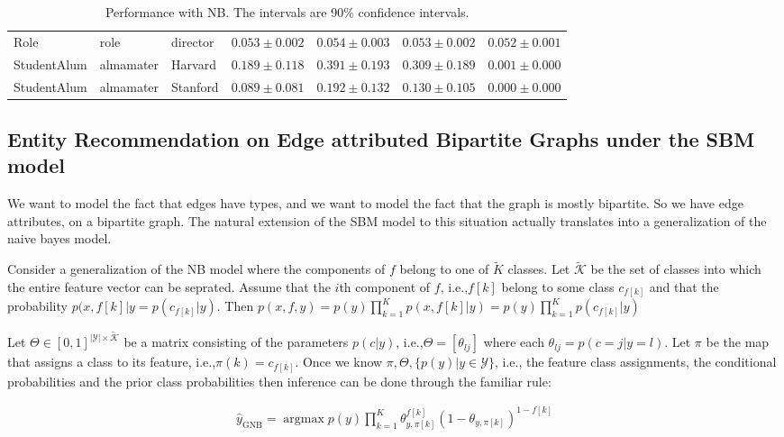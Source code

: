 \documentclass[paper=a4,fontsize=11pt]{scrartcl}
\newcommand{\ie}{i.e.,\xspace}
\newcommand{\argmax}[1]{\underset{#1}{\operatorname*{argmax}}}
\numberwithin{equation}{section}    %
\numberwithin{figure}{section}      %
\numberwithin{table}{section}       %
\begin{document}
\begin{table}[htbp]
{\begin{tabular}{l l l | c c c c}
Role                 & role         & director        & $0.053 \pm 0.002 $ & $0.054 \pm 0.003 $ & $0.053 \pm 0.002 $ & $0.052 \pm 0.001 $\\
StudentAlum          & almamater    & Harvard         & $0.189 \pm 0.118 $ & $0.391 \pm 0.193 $ & $0.309 \pm 0.189 $ & $0.001 \pm 0.000 $\\
StudentAlum          & almamater    & Stanford        & $0.089 \pm 0.081 $ & $0.192 \pm 0.132 $ & $0.130 \pm 0.105 $ & $0.000 \pm 0.000 $\\
\end{tabular}}
  \caption{Performance with NB. The intervals are 90\% confidence intervals.}
  \label{tab:perf-nb}
\end{table}


\subsection{Entity Recommendation on Edge attributed Bipartite Graphs under the SBM model}
\label{sec:er-vn}
We want to model the fact that edges have types, and we want to model the fact that
the graph is mostly bipartite. So we have edge attributes, on a bipartite graph.
The natural extension of the SBM model to this situation actually translates
into a generalization of the naive bayes model.

Consider a generalization of the NB model where the components of $f$ belong to
one of $\tilde{K}$ classes. Let $\mathcal{\tilde{K}}$ be the set of classes into
which the entire feature vector can be seprated. Assume that the $i$th component
of $f$, \ie $f[k]$ belong to some class $c_{f[k]}$ and that the probability
$p(x, f[k] | y = p(c_{f[k]} | y)$. Then $p(x, f, y) = p(y) \prod_{k=1}^K p(x,
f[k] | y) = p(y) \prod_{k=1}^K p(c_{f[k]} | y)$

Let $\Theta \in [0, 1]^{|\mathcal{Y}| \times \mathcal{\tilde{K}}}$ be a matrix
consisting of the parameters $p(c | y)$, \ie $\Theta = [\theta_{lj}]$ where
each $\theta_{lj} = p(c=j | y=l)$. Let $\pi$ be the map that assigns a class to
its feature, \ie $\pi(k) = c_{f[k]}$. Once we know
$\pi, \Theta, \{p(y) | y \in \mathcal{Y}\}$, \ie the
feature class assignments, the conditional probabilities and the prior class
probabilities  then inference can be done through the familiar rule:

\begin{align}
  \hat{y}_{\mathrm{GNB}} = \argmax{} p(y) \prod_{k=1}^K \theta_{y, \pi[k]}^{f[k]}
  (1 - \theta_{y, \pi[k]})^{1-f[k]}
\end{align}
\end{document}
